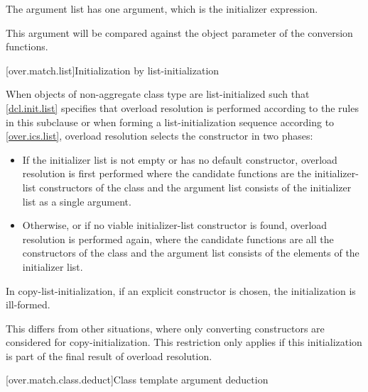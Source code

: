 \pnum
The argument list has one argument, which is the initializer expression.
\begin{note}
This argument will be compared against
the object parameter of the conversion functions.
\end{note}

[over.match.list]{Initialization by list-initialization}%

\pnum
When objects of non-aggregate class type  are
list-initialized such that \ref{dcl.init.list} specifies that overload resolution
is performed according to the rules in this subclause
or when forming a list-initialization sequence according to \ref{over.ics.list},
overload resolution selects the constructor in two phases:

\begin{itemize}
\item
If the initializer list is not empty or  has no default constructor,
overload resolution is first performed
where the candidate functions are the initializer-list constructors
of the class  and
the argument list consists of the initializer list as a single argument.

\item
Otherwise, or if no viable initializer-list constructor is found,
overload resolution is
performed again, where the candidate functions are all the constructors of
the class  and
the argument list consists of the elements of the initializer list.
\end{itemize}

In copy-list-initialization, if an explicit constructor is
chosen, the initialization is ill-formed.
\begin{note}
This differs from other situations,
where only converting constructors are considered for copy-initialization.
This restriction only
applies if this initialization is part of the final result of overload
resolution.
\end{note}

[over.match.class.deduct]{Class template argument deduction}%
%

